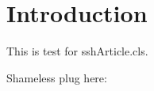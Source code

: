 \documentclass[main]{sshArticle}
\begin{document}
\maketitle
\section*{Introduction}
This is test for sshArticle.cls.

Shameless plug here: ~\cite{Sung_2022}
\end{document}
